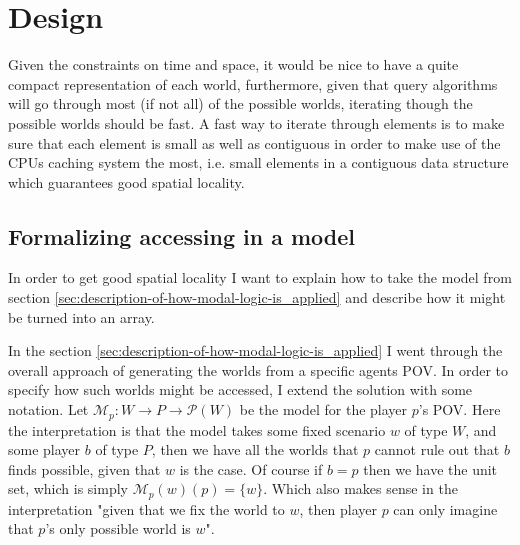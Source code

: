 \section{Design}

\newcommand{\POVModel}{\mathcal{M}}






Given the constraints on time and space, it would be nice to have a quite compact representation of each world, furthermore, given that query algorithms will go through most (if not all) of the possible worlds, iterating though the possible worlds should be fast. A fast way to iterate through elements is to make sure that each element is small as well as contiguous in order to make use of the CPUs caching system the most, i.e. small elements in a contiguous data structure which guarantees good spatial locality.


\subsection{Formalizing accessing in a model} \label{sec:model-access}
In order to get good spatial locality I want to explain how to take the model from section \ref{sec:description-of-how-modal-logic-is_applied} and describe how it might be turned into an array.

In the section \ref{sec:description-of-how-modal-logic-is_applied} I went through the overall approach of generating the worlds from a specific agents POV. In order to specify how such worlds might be accessed, I extend the solution with some notation. Let $\POVModel_p: W \rightarrow P \rightarrow \mathcal{P}(W)$ be the model for the player $p$'s POV. Here the interpretation is that the model takes some fixed scenario $w$ of type $W$, and some player $b$ of type $P$, then we have all the worlds that $p$ cannot rule out that $b$ finds possible, given that $w$ is the case. Of course if $b=p$ then we have the unit set, which is simply $\POVModel_p(w)(p) = \{w\}$. Which also makes sense in the interpretation "given that we fix the world to $w$, then player $p$ can only imagine that $p$'s only possible world is $w$". 

